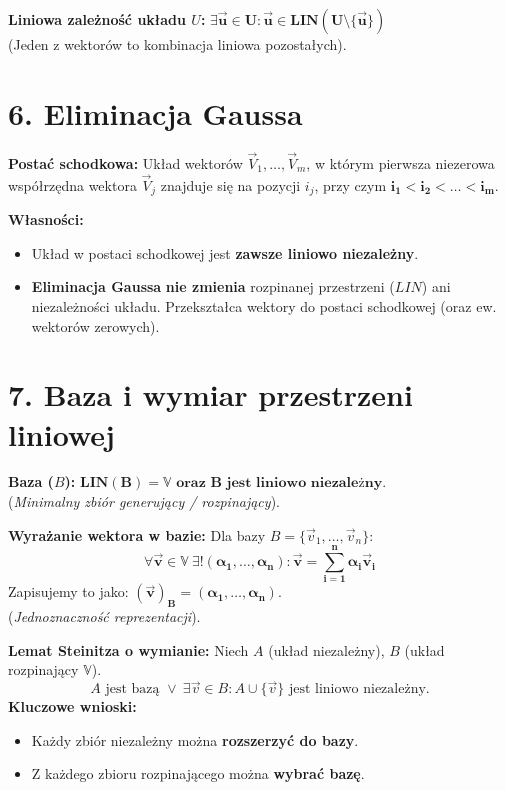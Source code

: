 \documentclass[12pt,a4paper]{article}
\begin{document}
\noindent\textbf{Liniowa zależność układu $U$:} $\mathbf{\exists \vec{u} \in U: \vec{u} \in LIN(U \setminus \{\vec{u}\})}$ \\
(Jeden z wektorów to kombinacja liniowa pozostałych).

\section*{6. Eliminacja Gaussa}
\noindent\textbf{Postać schodkowa:} Układ wektorów $\vec{V}_1, \dots, \vec{V}_m$, w którym pierwsza niezerowa współrzędna wektora $\vec{V}_j$ znajduje się na pozycji $i_j$, przy czym $\mathbf{i_1 < i_2 < \dots < i_m}$.

\noindent\textbf{Własności:}
\begin{itemize}
    \item Układ w postaci schodkowej jest \textbf{zawsze liniowo niezależny}.
    \item \textbf{Eliminacja Gaussa} \textbf{nie zmienia} rozpinanej przestrzeni ($LIN$) ani niezależności układu. Przekształca wektory do postaci schodkowej (oraz ew. wektorów zerowych).
\end{itemize}

\section*{7. Baza i wymiar przestrzeni liniowej}
\noindent\textbf{Baza ($B$):} $\mathbf{LIN(B) = \mathbb{V} \text{ oraz B jest liniowo niezależny}}$. \\
(\textit{Minimalny zbiór generujący / rozpinający}).

\noindent\textbf{Wyrażanie wektora w bazie:} Dla bazy $B=\{\vec{v}_1, \dots, \vec{v}_n\}$:
$$ \mathbf{\forall \vec{v} \in \mathbb{V} \ \exists! (\alpha_1, \dots, \alpha_n): \vec{v} = \sum_{i=1}^n \alpha_i \vec{v}_i} $$
Zapisujemy to jako: $\mathbf{(\vec{v})_B = (\alpha_1, \dots, \alpha_n)}$. \\
(\textit{Jednoznaczność reprezentacji}).

\noindent\textbf{Lemat Steinitza o wymianie:} Niech $A$ (układ niezależny), $B$ (układ rozpinający $\mathbb{V}$).
$$ A \text{ jest bazą } \lor \ \exists \vec{v} \in B: A \cup \{\vec{v}\} \text{ jest liniowo niezależny.} $$
\textbf{Kluczowe wnioski:} 
\begin{itemize}
    \item Każdy zbiór niezależny można \textbf{rozszerzyć do bazy}.
    \item Z każdego zbioru rozpinającego można \textbf{wybrać bazę}.
\end{itemize}
\end{document}

